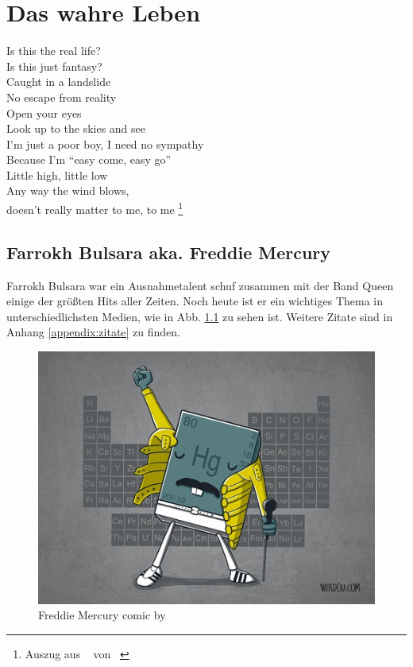 \chapter{Das wahre Leben}

\begin{center}
Is this the real life? \\
Is this just fantasy? \\
Caught in a landslide \\
No escape from reality \\
Open your eyes \\
Look up to the skies and see \\
I'm just a poor boy, I need no sympathy \\
Because I'm \enquote{easy come, easy go} \\
Little high, little low \\
Any way the wind blows, \\
doesn't really matter to me, 
to me \footnote{Auszug aus ~\cite{BohemRhap} von \citeauthor{Queen}~\cite{Queen} }\\
\end{center}

\section{Farrokh Bulsara aka. Freddie Mercury}

Farrokh Bulsara war ein Ausnahmetalent schuf zusammen mit der Band Queen einige der größten Hits aller Zeiten. Noch heute ist er ein wichtiges Thema in unterschiedlichsten Medien, wie in Abb. \ref{fig:freddiehg} zu sehen ist. Weitere Zitate sind in Anhang \ref{appendix:zitate} zu finden.
\begin{figure}
\begin{center} \includegraphics{figures/freddie_mercury_by_wirdoudesigns.jpg} \end{center}
\caption{Freddie Mercury comic by~\citeauthor{wirdou}~\cite{wirdou}}
\label{fig:freddiehg}
\end{figure}

\newpage